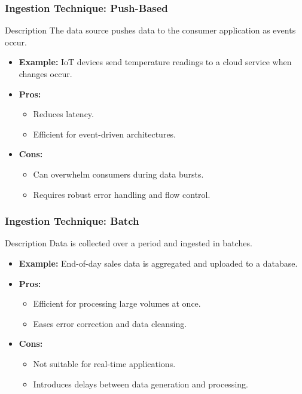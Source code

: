 \documentclass[aspectratio=169]{beamer}
\begin{document}
\begin{frame}
    \frametitle{Ingestion Technique: Push-Based}
    \begin{block}{Description}
        The data source pushes data to the consumer application as events occur.
    \end{block}
    \begin{itemize}
        \item \textbf{Example:} IoT devices send temperature readings to a cloud service when changes occur.
        \item \textbf{Pros:}
            \begin{itemize}
                \item Reduces latency.
                \item Efficient for event-driven architectures.
            \end{itemize}
        \item \textbf{Cons:}
            \begin{itemize}
                \item Can overwhelm consumers during data bursts.
                \item Requires robust error handling and flow control.
            \end{itemize}
    \end{itemize}
\end{frame}

\begin{frame}
    \frametitle{Ingestion Technique: Batch}
    \begin{block}{Description}
        Data is collected over a period and ingested in batches.
    \end{block}
    \begin{itemize}
        \item \textbf{Example:} End-of-day sales data is aggregated and uploaded to a database.
        \item \textbf{Pros:}
            \begin{itemize}
                \item Efficient for processing large volumes at once.
                \item Eases error correction and data cleansing.
            \end{itemize}
        \item \textbf{Cons:}
            \begin{itemize}
                \item Not suitable for real-time applications.
                \item Introduces delays between data generation and processing.
            \end{itemize}
    \end{itemize}
\end{frame}
\end{document}
